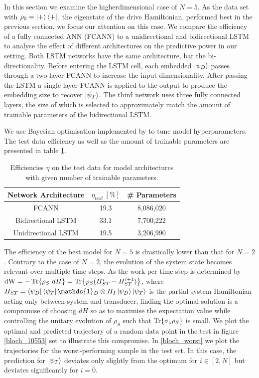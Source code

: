 In this section we examine the higherdimensional case of $N=5$.
As the data set with $\rho_0 = \ket{+} \bra{+}$, the eigenstate of the drive Hamiltonian, performed best in the previous section, we focus our attention on this case.
We compare the efficiency of a fully connected ANN (FCANN) to a unidirectional and bidirectional LSTM to analyse the effect of different architectures on the predictive power in our setting.
Both LSTM networks have the same architecture, bar the bi-directionality.
Before entering the LSTM cell, each embedded $\ket{\psi_D}$ passes through a two layer FCANN to increase the input dimensionality. 
After passing the LSTM a single layer FCANN is applied to the output to produce the embedding size to recover $\ket{\psi_T}$.
The third network uses three fully connected layers, the size of which is selected to approximately match the amount of trainable parameters of the bidirectional LSTM.

We use Bayesian optimisation implemented by \cite{wandb} to tune model hyperparameters.
The test data efficiency as well as the amount of trainable parameters are presented in table \ref{n5efftable}.

\begin{table}[h]
	\centering
	\begin{tabular}{ c | c | c}
		Network Architecture & $\eta_{test} \ [\%]$  & \# Parameters \\
		\hline
		FCANN & 19.3 & 8,086,020 \\
		Bidirectional LSTM & 33.1 & 7,700,222 \\
		Unidirectional LSTM & 19.5 & 3,206,990\\
	\end{tabular}
	\caption{Efficiencies $\eta$ on the test data for model architectures with given number of trainable parameters.}
	\label{n5efftable}
\end{table}

The efficiency of the best model for $N=5$ is drastically lower than that for $N=2$.
Contrary to the case of $N=2$, the evolution of the system state becomes relevant over multiple time steps.
As the work per time step is determined by $\mathrm{dW} = -\Tr{\rho_S \ dH} = \Tr{\rho_S (H_{ST}^i - H_{ST}^{i+1})}$, where $H_{ST} = \bra{\psi_D}\bra{\psi_T} \mathds{1}_D \otimes H_I \ket{\psi_D} \ket{\psi_T}$ is the partial system Hamiltonian acting only between system and transducer, finding the optimal solution is a compromise of choosing $dH$ so as to maximise the expectation value while controlling the unitary evolution of $\rho_S$ such that $\Tr{\sigma_z \rho_S}$ is small.
We plot the optimal and predicted trajectory of a random data point in the test in figure \ref{bloch_10553} set to illustrate this compromise.
In \ref{bloch_worst} we plot the trajectories for the worst-performing sample in the test set.
In this case, the prediction for $\ket{\psi_T}$ deviates only slightly from the optimum for $i \in [2, N]$ but deviates significantly for $i=0$.



